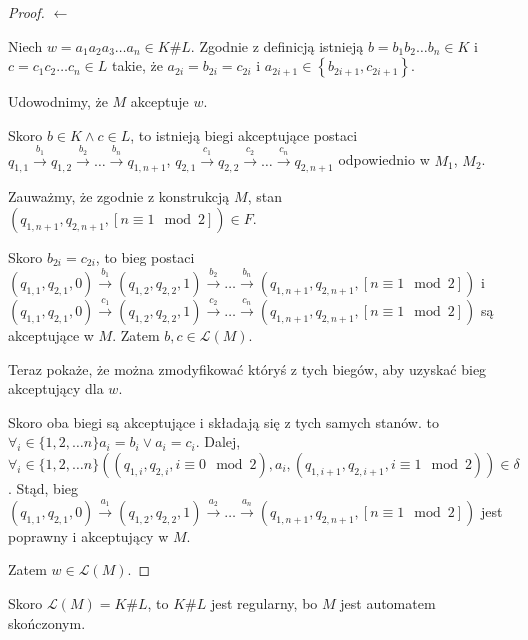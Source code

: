 \documentclass{article}
\theoremstyle{definition}
\theoremstyle{remark}
\begin{document}
\begin{proof}
    \(\leftarrow\)

    Niech \(w = a_1 a_2 a_3\ldots a_n \in K \# L\). Zgodnie z definicją istnieją
    \(b=b_1 b_2 \ldots b_n \in K\) i \(c=c_1 c_2 \ldots c_n \in L\) takie, że
    \(a_{2i} = b_{2i} = c_{2i}\) i \(a_{2i+1} \in \left\{ b_{2i+1}, c_{2i+1}
    \right\}\).

    Udowodnimy, że \(M\) akceptuje \(w\).

    Skoro \(b \in K \land c \in L\), to istnieją biegi akceptujące postaci
    \(q_{1,1} \xrightarrow{b_1} q_{1,2} \xrightarrow{b_2} \ldots \xrightarrow{b_n}
    q_{1,n+1}\), \(q_{2,1} \xrightarrow{c_1} q_{2,2} \xrightarrow{c_2} \ldots
    \xrightarrow{c_n} q_{2,n+1}\) odpowiednio w \(M_1\), \(M_2\).

    Zauważmy, że zgodnie z konstrukcją \(M\), stan \( \left( q_{1,n+1}, q_{2,n+1},
    \left[ n \equiv 1 \mod 2 \right] \right) \in F\).

    Skoro \(b_{2i} = c_{2i}\), to bieg postaci \( \left(q_{1,1}, q_{2,1}, 0 \right)
    \xrightarrow{b_1} \left(q_{1,2}, q_{2,2}, 1 \right) \xrightarrow{b_2} \ldots
    \xrightarrow{b_n} \left(q_{1,n+1}, q_{2,n+1}, \left[ n \equiv 1 \mod 2 \right]
    \right) \) i \( \left(q_{1,1}, q_{2,1}, 0 \right) \xrightarrow{c_1}
    \left(q_{1,2}, q_{2,2}, 1 \right) \xrightarrow{c_2} \ldots \xrightarrow{c_n}
    \left(q_{1,n+1}, q_{2,n+1}, \left[ n \equiv 1 \mod 2 \right] \right) \) są
    akceptujące w \(M\). Zatem \(b, c \in \mathcal{L}(M)\).

    Teraz pokaże, że można zmodyfikować któryś z tych biegów, aby uzyskać bieg
    akceptujący dla \(w\).

    Skoro oba biegi są akceptujące i składają się z tych samych stanów. to \(
    \forall_i \in \{1,2,\ldots n\} a_i = b_i \lor a_i = c_i \). Dalej, \( \forall_i
    \in \{1,2,\ldots n\} \left( \left( q_{1,i}, q_{2,i}, i \equiv 0 \mod 2 \right),
    a_i, \left( q_{1,i+1}, q_{2,i+1}, i \equiv 1 \mod 2 \right) \right) \in \delta
    \). Stąd, bieg \( \left(q_{1,1}, q_{2,1}, 0 \right) \xrightarrow{a_1}
    \left(q_{1,2}, q_{2,2}, 1 \right) \xrightarrow{a_2} \ldots \xrightarrow{a_n}
    \left(q_{1,n+1}, q_{2,n+1}, \left[ n \equiv 1 \mod 2 \right] \right) \) jest
    poprawny i akceptujący w \(M\).

    Zatem \(w \in \mathcal{L}(M)\).
\end{proof}

Skoro \(\mathcal{L}(M) = K \# L\), to \(K \# L\) jest regularny, bo \(M\) jest
automatem skończonym.
\end{document}
